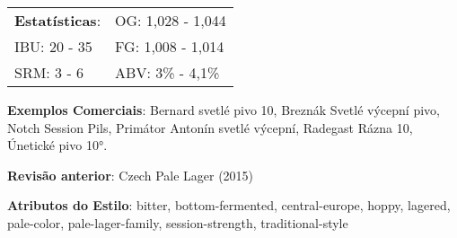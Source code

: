 \begin{tabular}{@{}p{35mm}p{35mm}@{}}
  \textbf{Estatísticas}: & OG: 1,028 - 1,044 \\
  IBU: 20 - 35  & FG: 1,008 - 1,014  \\
  SRM: 3 - 6   & ABV: 3\% - 4,1\%
\end{tabular}

\textbf{Exemplos Comerciais}: Bernard svetlé pivo 10, Breznák Svetlé výcepní pivo, Notch Session Pils, Primátor Antonín svetlé výcepní, Radegast Rázna 10, Únetické pivo 10°.

\textbf{Revisão anterior}: Czech Pale Lager (2015)

\textbf{Atributos do Estilo}: bitter, bottom-fermented, central-europe, hoppy, lagered, pale-color, pale-lager-family, session-strength, traditional-style